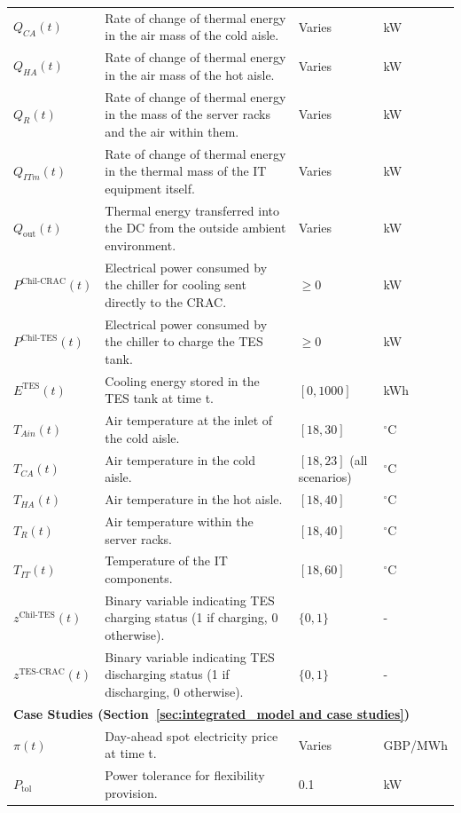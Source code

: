 \documentclass[lettersize,journal]{IEEEtran}
\begin{document}
{{\begin{longtable}{p{} p{} p{} p{}}
$Q_{CA}(t)$ & Rate of change of thermal energy in the air mass of the cold aisle. & Varies &kW \\
$Q_{HA}(t)$ & Rate of change of thermal energy in the air mass of the hot aisle. & Varies &kW \\
$Q_{R}(t)$ & Rate of change of thermal energy in the mass of the server racks and the air within them. & Varies &kW \\
$Q_{ITm}(t)$ & Rate of change of thermal energy in the thermal mass of the IT equipment itself. & Varies &kW \\
$Q_{\mathrm{out}}(t)$ & Thermal energy transferred into the DC from the outside ambient environment. & Varies &kW \\
$P^{\mathrm{Chil}\text{-}\mathrm{CRAC}}(t)$ & Electrical power consumed by the chiller for cooling sent directly to the CRAC. & $\geq 0$ &kW \\
$P^{\mathrm{Chil}\text{-}\mathrm{TES}}(t)$ & Electrical power consumed by the chiller to charge the TES tank. & $\geq 0$ &kW \\
$E^{\mathrm{TES}}(t)$ & Cooling energy stored in the TES tank at time t. & $[0, 1000]$ &kWh \\
$T_{Ain}(t)$ & Air temperature at the inlet of the cold aisle. & $[18, 30]$ & $^{\circ}$C \\
$T_{CA}(t)$ & Air temperature in the cold aisle. & $[18, 23]$ (all scenarios) & $^{\circ}$C \\
$T_{HA}(t)$ & Air temperature in the hot aisle. & $[18, 40]$ & $^{\circ}$C \\
$T_{R}(t)$ & Air temperature within the server racks. & $[18, 40]$ & $^{\circ}$C \\
$T_{IT}(t)$ & Temperature of the IT components. & $[18, 60]$ & $^{\circ}$C \\
$z^{\mathrm{Chil}\text{-}\mathrm{TES}}(t)$ & Binary variable indicating TES charging status (1 if charging, 0 otherwise). & $\{0, 1\}$ & - \\
$z^{\mathrm{TES}\text{-}\mathrm{CRAC}}(t)$ & Binary variable indicating TES discharging status (1 if discharging, 0 otherwise). & $\{0, 1\}$ & - \\
\midrule
\multicolumn{4}{l}{\textbf{Case Studies (Section~\ref{sec:integrated_model and case studies})}} \\
\midrule
$\pi(t)$ & Day-ahead spot electricity price at time t. & Varies & GBP/MWh \\
$P_{\mathrm{tol}}$ & Power tolerance for flexibility provision. & 0.1 &kW \\

\end{longtable}}}
\end{document}
